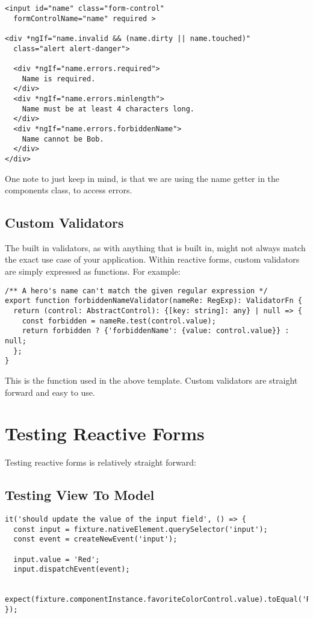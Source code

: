 \begin{lstlisting}
<input id="name" class="form-control"
  formControlName="name" required >

<div *ngIf="name.invalid && (name.dirty || name.touched)"
  class="alert alert-danger">

  <div *ngIf="name.errors.required">
    Name is required.
  </div>
  <div *ngIf="name.errors.minlength">
    Name must be at least 4 characters long.
  </div>
  <div *ngIf="name.errors.forbiddenName">
    Name cannot be Bob.
  </div>
</div>
\end{lstlisting}

One note to just keep in mind, is that we are using the name getter in the components class, to access errors. 

\subsection{Custom Validators}
The built in validators, as with anything that is built in, might not always match the exact use case of your application. Within reactive forms, custom validators are simply expressed as functions. For example: 

\begin{lstlisting}
/** A hero's name can't match the given regular expression */
export function forbiddenNameValidator(nameRe: RegExp): ValidatorFn {
  return (control: AbstractControl): {[key: string]: any} | null => {
    const forbidden = nameRe.test(control.value);
    return forbidden ? {'forbiddenName': {value: control.value}} : null;
  };
}
\end{lstlisting}

This is the function used in the above template. Custom validators are straight forward and easy to use. 

\section{ Testing Reactive Forms }
Testing reactive forms is relatively straight forward: 

\subsection{ Testing View To Model }

\begin{lstlisting}[caption=Testing View to Model]
  it('should update the value of the input field', () => {
  const input = fixture.nativeElement.querySelector('input');
  const event = createNewEvent('input');

  input.value = 'Red';
  input.dispatchEvent(event);

  expect(fixture.componentInstance.favoriteColorControl.value).toEqual('Red');
});
\end{lstlisting}


